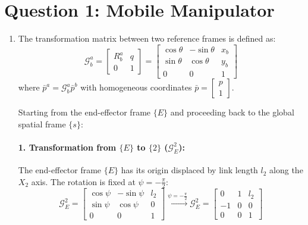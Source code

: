 \section{Question 1: Mobile Manipulator}

\begin{enumerate}[label=\textbf{(\alph*)}]
    \item The transformation matrix between two reference frames is defined as:
    \begin{equation}
        \mathcal{G}_b^a = \begin{bmatrix}
            R_b^a & q \\
            0 & 1
        \end{bmatrix} = \begin{bmatrix}
            \cos\theta & -\sin\theta & x_b \\
            \sin\theta & \cos\theta & y_b \\
            0 & 0 & 1
        \end{bmatrix}
    \end{equation}
    where $\bar{p}^a = \mathcal{G}_b^a \bar{p}^b$ with homogeneous coordinates $\bar{p} = \begin{bmatrix} p \\ 1 \end{bmatrix}$.

    Starting from the end-effector frame $\{E\}$ and proceeding back to the global spatial frame $\{s\}$:

    \paragraph{1. Transformation from $\{E\}$ to $\{2\}$ ($\mathcal{G}_E^2$):}
    The end-effector frame $\{E\}$ has its origin displaced by link length $l_2$ along the $X_2$ axis. The rotation is fixed at $\psi = -\frac{\pi}{2}$:
    \begin{equation}
        \mathcal{G}_E^2 = \begin{bmatrix}
            \cos\psi & -\sin\psi & l_2 \\
            \sin\psi & \cos\psi & 0 \\
            0 & 0 & 1
        \end{bmatrix} \xrightarrow{\psi = -\frac{\pi}{2}} \mathcal{G}_E^2 = \begin{bmatrix}
            0 & 1 & l_2 \\
            -1 & 0 & 0 \\
            0 & 0 & 1
        \end{bmatrix}
    \end{equation}


\end{enumerate}
